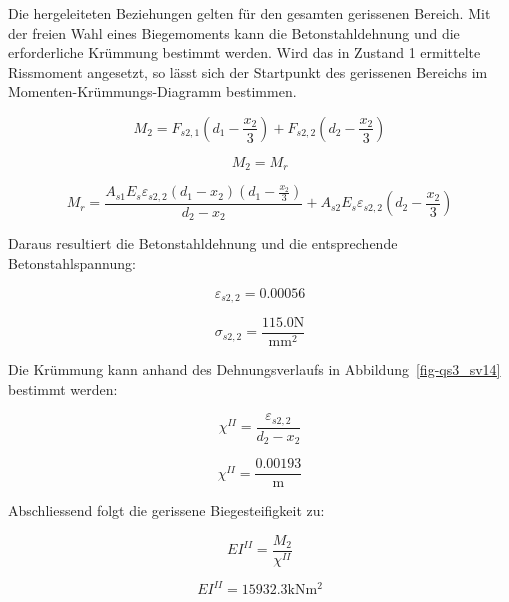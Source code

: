 \documentclass[
  12pt,
  letterpaper,
  egregdoesnotlikesansseriftitles]{scrreprt}
\begin{document}
Die hergeleiteten Beziehungen gelten für den gesamten gerissenen
Bereich. Mit der freien Wahl eines Biegemoments kann die
Betonstahldehnung und die erforderliche Krümmung bestimmt werden. Wird
das in Zustand 1 ermittelte Rissmoment angesetzt, so lässt sich der
Startpunkt des gerissenen Bereichs im Momenten-Krümmungs-Diagramm
bestimmen.

\begin{equation}M_{2} = F_{s2,1} \left(d_{1} - \frac{x_{2}}{3}\right) + F_{s2,2} \left(d_{2} - \frac{x_{2}}{3}\right)\end{equation}

\begin{equation}M_{2} = M_{r}\end{equation}

\begin{equation}M_{r} = \frac{A_{s 1} E_{s} \varepsilon_{s2,2} \left(d_{1} - x_{2}\right) \left(d_{1} - \frac{x_{2}}{3}\right)}{d_{2} - x_{2}} + A_{s 2} E_{s} \varepsilon_{s2,2} \left(d_{2} - \frac{x_{2}}{3}\right)\end{equation}

Daraus resultiert die Betonstahldehnung und die entsprechende
Betonstahlspannung:

\begin{equation}\varepsilon_{s2,2} = 0.00056\end{equation}

\begin{equation}\sigma_{s 2,2} = \frac{115.0 \text{N}}{\text{mm}^{2}}\end{equation}

Die Krümmung kann anhand des Dehnungsverlaufs in
Abbildung~\ref{fig-qs3_sv14} bestimmt werden:

\begin{equation}\chi^{II} = \frac{\varepsilon_{s2,2}}{d_{2} - x_{2}}\end{equation}

\begin{equation}\chi^{II} = \frac{0.00193}{\text{m}}\end{equation}

Abschliessend folgt die gerissene Biegesteifigkeit zu:

\begin{equation}EI^{II} = \frac{M_{2}}{\chi^{II}}\end{equation}

\begin{equation}EI^{II} = 15932.3 \text{kN} \text{m}^{2}\end{equation}
\end{document}
